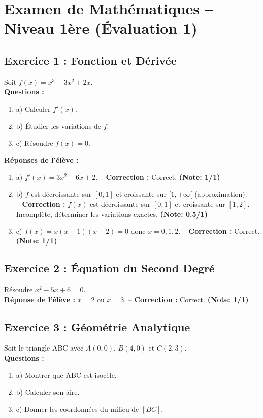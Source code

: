 \documentclass{article}
\begin{document}
\section*{Examen de Mathématiques – Niveau 1ère (Évaluation 1)}

\subsection*{Exercice 1 : Fonction et Dérivée}
Soit $f(x) = x^3 - 3x^2 + 2x$. \\
\textbf{Questions :}
\begin{enumerate}
    \item a) Calculer $f'(x)$.
    \item b) Étudier les variations de $f$.
    \item c) Résoudre $f(x) = 0$.
\end{enumerate}

\textbf{Réponses de l’élève :}
\begin{enumerate}
    \item a) $f'(x) = 3x^2 - 6x + 2$. -- \textbf{Correction :} Correct. \textbf{(Note: 1/1)}
    \item b) $f$ est décroissante sur $[0,1]$ et croissante sur $[1,+\infty[$ (approximation). \\
    -- \textbf{Correction :} $f(x)$ est décroissante sur $[0,1]$ et croissante sur $[1,2]$. Incomplète, déterminer les variations exactes. \textbf{(Note: 0.5/1)}
    \item c) $f(x) = x(x-1)(x-2) = 0$ donc $x = 0, 1, 2$. -- \textbf{Correction :} Correct. \textbf{(Note: 1/1)}
\end{enumerate}

\subsection*{Exercice 2 : Équation du Second Degré}
Résoudre $x^2 - 5x + 6 = 0$. \\
\textbf{Réponse de l’élève :} $x = 2$ ou $x = 3$. -- \textbf{Correction :} Correct. \textbf{(Note: 1/1)}

\subsection*{Exercice 3 : Géométrie Analytique}
Soit le triangle ABC avec $A(0,0)$, $B(4,0)$ et $C(2,3)$. \\
\textbf{Questions :}
\begin{enumerate}
    \item a) Montrer que ABC est isocèle.
    \item b) Calculer son aire.
    \item c) Donner les coordonnées du milieu de $[BC]$.
\end{enumerate}
\end{document}
